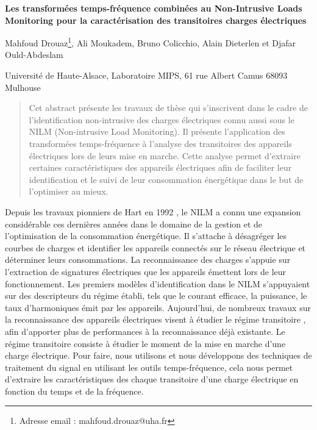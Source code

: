 \documentclass[12pt, a4paper]{article}
\begin{document}
\begin{center}
\large\sc 
\begin{flushleft}
    \bf
    {\large Les transformées temps-fréquence combinées au Non-Intrusive Loads Monitoring pour la caractérisation des transitoires charges électriques}
\end{flushleft}

{\normalsize Mahfoud Drouaz\footnote{Adresse email : mahfoud.drouaz@uha.fr}, Ali Moukadem, Bruno Colicchio, Alain Dieterlen et Djafar Ould-Abdeslam}

{\normalsize Université de Haute-Alsace, Laboratoire MIPS, 61 rue Albert Camus 68093 Mulhouse}
\end{center}

\begin{abstract}
{\footnotesize Cet abstract présente les travaux de thèse qui s'inscrivent dans le cadre de l'identification non-intrusive des charges électriques connu aussi sous le NILM (Non-intrusive Load Monitoring).  Il présente l'application des transformées temps-fréquence à l'analyse des transitoires des appareils électriques lors de leurs mise en marche. Cette analyse permet d'extraire certaines caractéristiques des appareils électriques afin de faciliter leur identification et le suivi de leur consommation énergétique dans le but de l'optimiser au mieux.}
\end{abstract}

{\normalsize Depuis les travaux pionniers de Hart en 1992 \cite{hart1992}, le NILM a connu une expansion considérable ces dernières années dans le domaine de la gestion et de l’optimisation de la   consommation énergétique. Il s’attache à désagréger les courbes de charges et identifier les appareils connectés sur le réseau électrique et déterminer leurs consommations. La reconnaissance des charges s’appuie sur l’extraction de signatures électriques que les appareils émettent lors de leur fonctionnement. Les premiers modèles d’identification dans le NILM s’appuyaient sur des descripteurs du régime établi, tels que le courant efficace, la puissance, le taux d’harmoniques émit par les appareils. Aujourd’hui, de nombreux travaux sur la reconnaissance des appareils électriques visent à étudier le régime transitoire \cite{naitmeziane2016, sanquer2013}, afin d'apporter plus de performances à la reconnaissance déjà existante. Le régime transitoire consiste à étudier le moment de la mise en marche d'une charge électrique. Pour faire, nous utilisons et nous développons des techniques de traitement du signal en utilisant les outils temps-fréquence, cela nous permet d'extraire les caractéristiques des chaque transitoire d'une charge électrique en fonction du temps et de la fréquence.}




\end{document}
